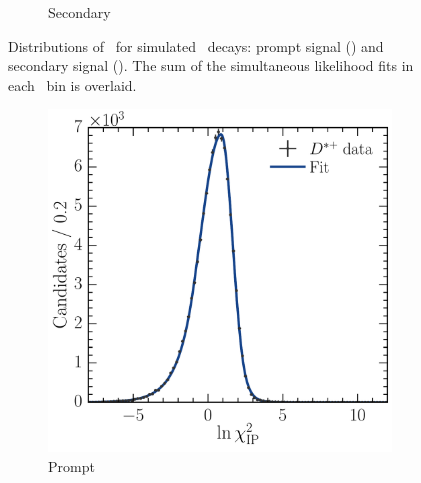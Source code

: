 \begin{figure}
\begin{subfigure}[b]{0.5\textwidth}
    \caption{Secondary}
    \label{fig:prod:fitting:prefits:DsToKKpi:secondary}
  \end{subfigure}
  \caption{%
    Distributions of \lnipchisq\ for simulated \DspTophipi\ decays: prompt 
    signal \PDsplus () and 
    secondary signal \PDsplus 
    ().
    The sum of the simultaneous likelihood fits in each \pTy\ bin is overlaid.
  }
  \label{fig:prod:fitting:prefits:DsToKKpi}
\end{figure}

\begin{figure}
  \begin{subfigure}[b]{0.5\textwidth}
    \centering
    \includegraphics[width=\textwidth]{figures/production/fitting/DstToD0pi_D0ToKpi_ipchisq_fit_pT_integrated_y_integrated_sig}
    \caption{Prompt}
    \label{fig:prod:fitting:prefits:DstToD0pi_D0ToKpi:prompt}
  \end{subfigure}
  \begin{subfigure}[b]{0.5\textwidth}
    \centering

\end{subfigure}
\end{figure}
